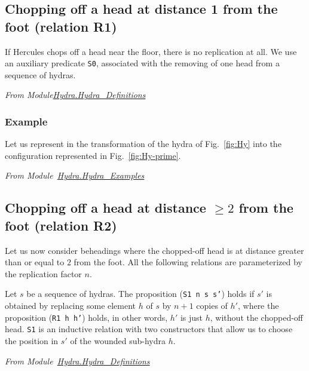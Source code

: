 \subsection{Chopping off a head at distance 1 from the foot (relation  R1)}

If Hercules chops off a head near the floor, there is no replication at all. We use an auxiliary 
predicate \texttt{S0}, associated with the removing of one head from a sequence of hydras.


\vspace{4pt}\emph{From Module\href{../theories/html/hydras.Hydra.Hydra_Definitions.html}{Hydra.Hydra\_Definitions}}





\subsubsection{Example}
\label{sec:orgheadline45}

Let us represent in \coq{}   the transformation of the hydra of Fig.~\vref{fig:Hy} into
the configuration represented in Fig.~\ref{fig:Hy-prime}.

\vspace{4pt}
\emph{From Module~\href{../theories/html/hydras.Hydra.Hydra_Examples.html}{Hydra.Hydra\_Examples}}





\subsection{Chopping off a head at distance \texorpdfstring{$\geq 2$}{>= 2} from the foot (relation R2) }


Let us now consider beheadings  where the chopped-off head is at distance greater than or equal to $2$ from the foot. All the following relations are parameterized by the replication factor  $n$.

 Let $s$ be a sequence of hydras. 
The proposition (\texttt{S1 n s s'}) holds if $s'$ is obtained by replacing some element $h$ of $s$ by 
$n+1$ copies of $h'$, where  the proposition (\texttt{R1 h h'}) holds, in other words, $h'$ is just $h$, without the chopped-off  head. \texttt{S1} is an inductive relation with two constructors that allow us to choose the position in $s'$ of the wounded sub-hydra $h$.

\vspace{4pt}
\noindent
\emph{From Module~\href{../theories/html/hydras.Hydra.Hydra_Definitions.html\#S1}{Hydra.Hydra\_Definitions}}

